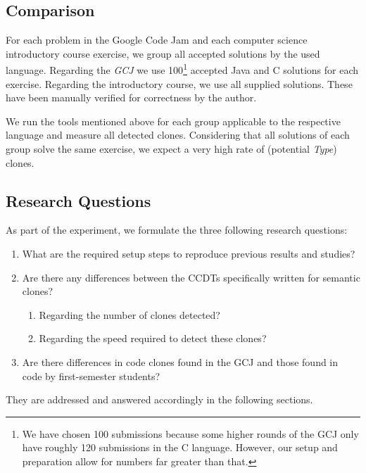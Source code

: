 \documentclass[10pt,journal,compsoc]{IEEEtran}
\def\T#1{\textsl{Type\nobreakdash-#1}}
\begin{document}
\subsection{Comparison}
For each problem in the Google Code Jam and each computer science introductory course exercise, we group all accepted solutions by the used language.
Regarding the \textsl{GCJ} we use 100\footnote{We have chosen 100 submissions because some higher rounds of the GCJ only have roughly 120 submissions in the C language. However, our setup and preparation allow for numbers far greater than that.} accepted Java and C solutions for each exercise. Regarding the introductory course, we use all supplied solutions. These have been manually verified for correctness by the author.

We run the tools mentioned above for each group applicable to the respective language and measure all detected clones.
Considering that all solutions of each group solve the same exercise, we expect a very high rate of (potential \T4) clones.




\subsection{Research Questions}
\label{subsec:research-question}As part of the experiment, we formulate the three following research questions:
\begin{enumerate}[label=RQ\arabic*),leftmargin=*]
  \item \label{rq-1}What are the required setup steps to reproduce previous results and studies?
  \item Are there any differences between the CCDTs specifically written for semantic clones?
  \begin{enumerate}[label=RQ1.\alph*),leftmargin=*,widest=R1.ii)]
    \item Regarding the number of clones detected?
    \item Regarding the speed required to detect these clones?
  \end{enumerate}
  \item Are there differences in code clones found in the GCJ and those found in code by first-semester students?
\end{enumerate}
They are addressed and answered accordingly in the following sections.
\end{document}
